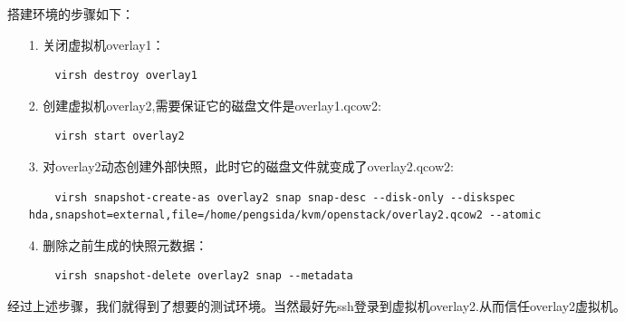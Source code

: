 \documentclass[a4paper,left=1.5cm,right=1.5cm,11pt]{article}
\begin{document}
	搭建环境的步骤如下：
	\begin{itemize}
		\item[1.] 关闭虚拟机overlay1：
		\begin{lstlisting}
	virsh destroy overlay1
		\end{lstlisting}

		\item[2.] 创建虚拟机overlay2,需要保证它的磁盘文件是overlay1.qcow2:
		\begin{lstlisting}
	virsh start overlay2
		\end{lstlisting}

		\item[3.] 对overlay2动态创建外部快照，此时它的磁盘文件就变成了overlay2.qcow2:
		\begin{lstlisting}
	virsh snapshot-create-as overlay2 snap snap-desc --disk-only --diskspec hda,snapshot=external,file=/home/pengsida/kvm/openstack/overlay2.qcow2 --atomic
		\end{lstlisting}

		\item[4.] 删除之前生成的快照元数据：
		\begin{lstlisting}
	virsh snapshot-delete overlay2 snap --metadata
		\end{lstlisting}
	\end{itemize}

	经过上述步骤，我们就得到了想要的测试环境。当然最好先ssh登录到虚拟机overlay2.从而信任overlay2虚拟机。
\end{document}
